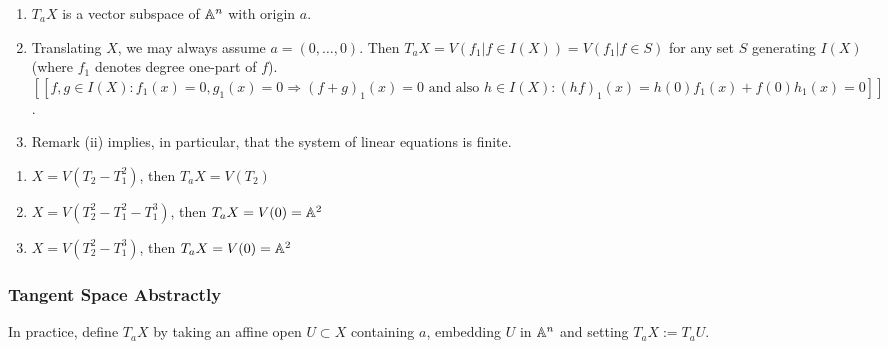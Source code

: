 \documentclass[a4paper,11pt]{article}
\begin{document}
				\begin{remark}
					\begin{enumerate}
						\item $T_aX$ is a vector subspace of $\AA^n$ with origin $a$.
						\item Translating $X$, we may always assume $a=(0,\dots,0)$. Then $T_aX=V(f_1|f\in I(X))=V(f_1|f\in S)$ for any set $S$ generating $I(X)$ (where $f_1$ denotes degree one-part of $f$).\\
						$[[f,g\in I(X): f_1(x)=0,g_1(x)=0\Longrightarrow (f+g)_1(x)=0\text{ and also }h\in I(X): (hf)_1(x)=h(0)f_1(x)+f(0)h_1(x)=0]]$.\\
						\item Remark (ii) implies, in particular, that the system of linear equations is finite.
					\end{enumerate}
				\end{remark}

				\begin{eg}
					\begin{enumerate}
						\item $X=V(T_2-T_1^2)$, then $T_aX=V(T_2)$
						\item $X=V(T_2^2-T_1^2-T_1^3)$, then $T_aX=V(0)=\AA^2$
						\item $X=V(T_2^2-T_1^3)$, then $T_aX=V(0)=\AA^2$
					\end{enumerate}
					\vspace{1em}
					\hfill{}\hfill{}
				\end{eg}

			\subsubsection*{Tangent Space Abstractly}

				In practice, define $T_aX$ by taking an affine open $U\subset X$ containing $a$, embedding $U$ in $\AA^n$ and setting $T_aX:=T_aU$.
				\\
\end{document}
